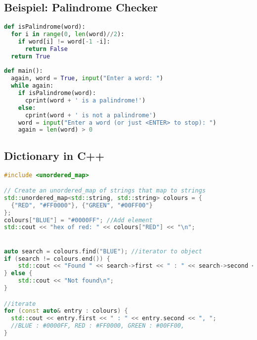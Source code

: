 \subsection{Beispiel: Palindrome Checker}
\begin{lstlisting}[language=Python]
def isPalindrome(word):
  for i in range(0, len(word)//2):
    if word[i] != word[-1 -i]:
      return False
  return True
    
def main():
  again, word = True, input("Enter a word: ")
  while again:
    if isPalindrome(word):
      cprint(word + ' is a palindrome!')
    else:
      cprint(word + ' is not a palindrome')
    word = input("Enter a word (or just <ENTER> to stop): ")
    again = len(word) > 0
\end{lstlisting}\vspace{-6px}

\subsection{Dictionary in C++}
\begin{lstlisting}[language=C++]
#include <unordered_map>

// Create an unordered_map of strings that map to strings
std::unordered_map<std::string, std::string> colours = {
  {"RED", "#FF0000"}, {"GREEN", "#00FF00"}
};
colours["BLUE"] = "#0000FF"; //Add element
std::cout << "hex of red: " << colours["RED"] << "\n";


auto search = colours.find("BLUE"); //iterator to object
if (search != colours.end()) {
    std::cout << "Found " << search->first << " : " << search->second << '\n';
} else {
    std::cout << "Not found\n";
}

//iterate
for (const auto& entry : colours) {
  std::cout << entry.first << " : " << entry.second << ", ";
  //BLUE : #0000FF, RED : #FF0000, GREEN : #00FF00,
}
\end{lstlisting}